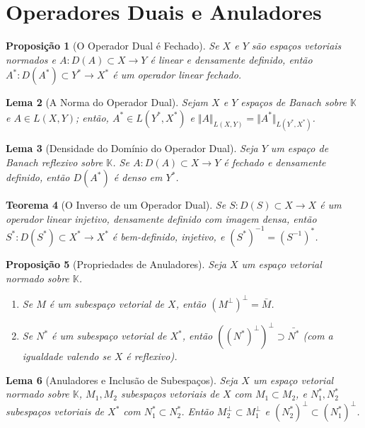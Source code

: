 \documentclass[12pt]{article}
\newtheorem{theorem}{Teorema}[section]
\newtheorem{proposition}[theorem]{Proposição}
\newtheorem{lemma}[theorem]{Lema}
\begin{document}
\section{Operadores Duais e Anuladores}
\begin{multicols}{3}
\begin{proposition}[O Operador Dual é Fechado]
Se $X$ e $Y$ são espaços vetoriais normados e $A: D(A) \subset X \to Y$ é linear e densamente definido, então $A^*: D(A^*) \subset Y^* \to X^*$ é um operador linear fechado.
\end{proposition}

\begin{lemma}[A Norma do Operador Dual]
Sejam $X$ e $Y$ espaços de Banach sobre $\mathbb{K}$ e $A \in L(X, Y)$; então, $A^* \in L(Y^*, X^*)$ e $\Vert A \Vert_{L(X, Y)} = \Vert A^* \Vert_{L(Y^*, X^*)}$.
\end{lemma}

\begin{lemma}[Densidade do Domínio do Operador Dual]
Seja $Y$ um espaço de Banach reflexivo sobre $\mathbb{K}$. Se $A: D(A) \subset X \to Y$ é fechado e densamente definido, então $D(A^*)$ é denso em $Y^*$.
\end{lemma}

\begin{theorem}[O Inverso de um Operador Dual]
Se $S: D(S) \subset X \to X$ é um operador linear injetivo, densamente definido com imagem densa, então $S^*: D(S^*) \subset X^* \to X^*$ é bem-definido, injetivo, e $(S^*)^{-1} = (S^{-1})^*$.
\end{theorem}

\begin{proposition}[Propriedades de Anuladores]
Seja $X$ um espaço vetorial normado sobre $\mathbb{K}$.
\begin{enumerate}
    \item Se $M$ é um subespaço vetorial de $X$, então $(M^\perp)^\perp = \bar{M}$.
    \item Se $N^*$ é um subespaço vetorial de $X^*$, então $((N^*)^\perp)^\perp \supset \bar{N^*}$ (com a igualdade valendo se $X$ é reflexivo).
\end{enumerate}
\end{proposition}

\begin{lemma}[Anuladores e Inclusão de Subespaços]
Seja $X$ um espaço vetorial normado sobre $\mathbb{K}$, $M_1, M_2$ subespaços vetoriais de $X$ com $M_1 \subset M_2$, e $N_1^*, N_2^*$ subespaços vetoriais de $X^*$ com $N_1^* \subset N_2^*$. Então $M_2^\perp \subset M_1^\perp$ e $(N_2^*)^\perp \subset (N_1^*)^\perp$.
\end{lemma}


\end{multicols}
\end{document}
